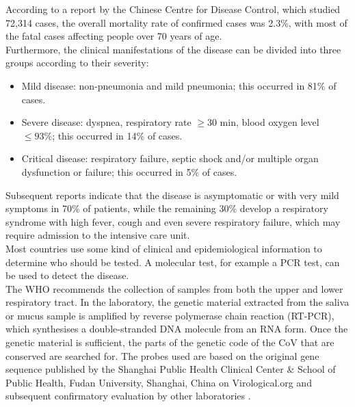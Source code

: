 According to a report by the Chinese Centre for Disease Control, which studied 72,314 cases, the overall mortality rate of confirmed cases was 2.3\%, with most of the fatal cases affecting people over 70 years of age. \\
Furthermore, the clinical manifestations of the disease can be divided into three groups according to their severity:
\begin{itemize}
    \item Mild disease: non-pneumonia and mild pneumonia; this occurred in 81\% of cases.
    \item Severe disease: dyspnea, respiratory rate $\geq 30$ min, blood oxygen level $\leq 93\%$; this occurred in 14\% of cases.
    \item Critical disease: respiratory failure, septic shock and/or multiple organ dysfunction or failure; this occurred in 5\% of cases.
\end{itemize}
Subsequent reports indicate that the disease is asymptomatic or with very mild symptoms in 70\% of patients, while the remaining 30\% develop a respiratory syndrome with high fever, cough and even severe respiratory failure, which may require admission to the intensive care unit. \\
Most countries use some kind of clinical and epidemiological information to determine who should be tested. A molecular test, for example a PCR test, can be used to detect the disease.\\
The WHO recommends the collection of samples from both the upper and lower respiratory tract. In the laboratory, the genetic material extracted from the saliva or mucus sample is amplified by reverse polymerase chain reaction (RT-PCR), which synthesises a double-stranded DNA molecule from an RNA form. Once the genetic material is sufficient, the parts of the genetic code of the CoV that are conserved are searched for. The probes used are based on the original gene sequence published by the Shanghai Public Health Clinical Center \& School of Public Health, Fudan University, Shanghai, China on Virological.org and subsequent confirmatory evaluation by other laboratories \autocite[][]{cascella2021features}.